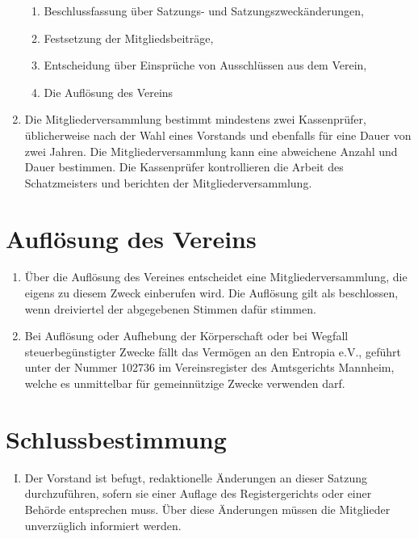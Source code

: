\documentclass[12pt,a4paper,titlepage]{scrartcl}
\begin{document}
\begin{enumerate}
\begin{enumerate}
\item Beschlussfassung über Satzungs- und Satzungszweckänderungen,
\item Festsetzung der Mitgliedsbeiträge,
\item Entscheidung über Einsprüche von Ausschlüssen aus dem Verein,
\item Die Auflösung des Vereins
\end{enumerate}
\item  Die Mitgliederversammlung bestimmt mindestens zwei Kassenprüfer, üblicherweise
nach der Wahl eines Vorstands und ebenfalls für eine Dauer von zwei Jahren. Die Mitgliederversammlung kann eine abweichene Anzahl und Dauer bestimmen. Die Kassenprüfer kontrollieren die Arbeit des Schatzmeisters und berichten der Mitgliederversammlung.
\end{enumerate}

\section{Auflösung des Vereins}
\begin{enumerate}
\item Über die Auflösung des Vereines entscheidet eine Mitgliederversammlung, die eigens zu diesem Zweck einberufen wird. Die Auflösung gilt als beschlossen, wenn dreiviertel der abgegebenen Stimmen dafür stimmen.
\item  Bei Auflösung oder Aufhebung der Körperschaft oder bei Wegfall steuerbegünstigter Zwecke fällt das Vermögen an den Entropia e.V., geführt unter der Nummer 102736 im Vereinsregister des Amtsgerichts Mannheim, welche es unmittelbar für gemeinnützige Zwecke verwenden darf.
\end{enumerate}


\section{Schlussbestimmung}
\begin{enumerate}[I.]
\item Der Vorstand ist befugt, redaktionelle Änderungen an dieser Satzung durchzuführen,
sofern sie einer Auflage des Registergerichts oder einer Behörde entsprechen muss. Über diese Änderungen müssen die Mitglieder unverzüglich informiert werden.
\end{enumerate}
\end{document}
